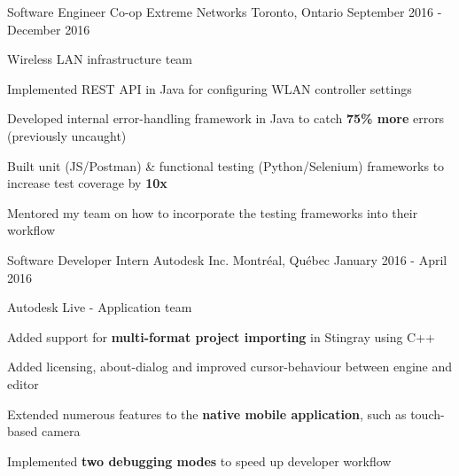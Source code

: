 


\begin{cventries}


\cventry
{Software Engineer Co-op}
{Extreme Networks}
{Toronto, Ontario}
{September 2016 - December 2016}
{ %
Wireless LAN infrastructure team
\begin{cvitems}
\item[]
\item {Implemented REST API in Java for configuring WLAN controller settings}
\item {Developed internal error-handling framework in Java to catch \textbf{75\% more} errors (previously uncaught)}
\item {Built unit (JS/Postman) \& functional testing (Python/Selenium) frameworks to increase test coverage by \textbf{10x}}
\item {Mentored my team on how to incorporate the testing frameworks into their workflow}
\end{cvitems}
}


\cventry
{Software Developer Intern}
{Autodesk Inc.}
{Montréal, Québec}
{January 2016 - April 2016}
{ %
Autodesk Live - Application team
\begin{cvitems}
\item[]
\item {Added support for \textbf{multi-format project importing} in Stingray using C++}
\item {Added licensing, about-dialog and improved cursor-behaviour between engine and editor}
\item {Extended numerous features to the \textbf{native mobile application}, such as touch-based camera}
\item {Implemented \textbf{two debugging modes} to speed up developer workflow}
\end{cvitems}
}


\end{cventries}
